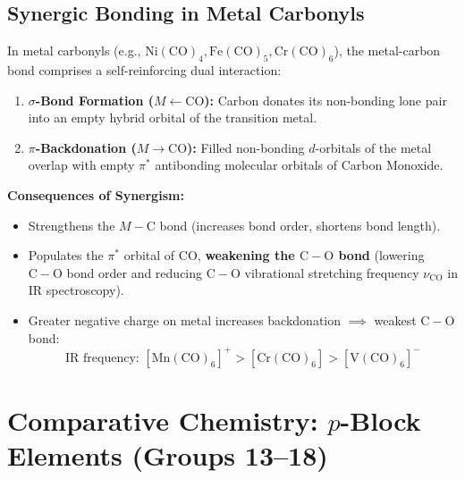 \documentclass[10pt,twoside,openright]{book}
\begin{document}
\subsection{Synergic Bonding in Metal Carbonyls}
\begin{conceptbox}
In metal carbonyls (e.g., $\mathrm{Ni(CO)_4, Fe(CO)_5, Cr(CO)_6}$), the metal-carbon bond comprises a self-reinforcing dual interaction:
\begin{enumerate}
  \item \textbf{$\sigma$-Bond Formation ($M \leftarrow \mathrm{CO}$):} Carbon donates its non-bonding lone pair into an empty hybrid orbital of the transition metal.
  \item \textbf{$\pi$-Backdonation ($M \to \mathrm{CO}$):} Filled non-bonding $d$-orbitals of the metal overlap with empty $\pi^*$ antibonding molecular orbitals of Carbon Monoxide.
\end{enumerate}
\textbf{Consequences of Synergism:}
\begin{itemize}
  \item Strengthens the $M-\mathrm{C}$ bond (increases bond order, shortens bond length).
  \item Populates the $\pi^*$ orbital of $\mathrm{CO}$, \textbf{weakening the $\mathrm{C-O}$ bond} (lowering $\mathrm{C-O}$ bond order and reducing $\mathrm{C-O}$ vibrational stretching frequency $\nu_{\mathrm{CO}}$ in IR spectroscopy).
  \item Greater negative charge on metal increases backdonation $\implies$ weakest $\mathrm{C-O}$ bond:
  \begin{equation}
    \text{IR frequency: } \mathrm{[Mn(CO)_6]^+ > [Cr(CO)_6] > [V(CO)_6]^-}
  \end{equation}
\end{itemize}
\end{conceptbox}

\section{Comparative Chemistry: $p$-Block Elements (Groups 13--18)}
\end{document}
